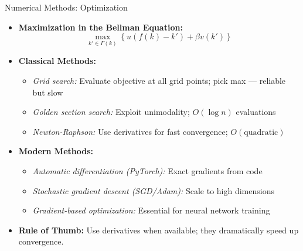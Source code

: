 \documentclass[10pt,english,aspectratio=169]{beamer}
\begin{document}
\begin{frame}{Numerical Methods: Optimization}
\begin{itemize}
\item \textbf{Maximization in the Bellman Equation:}
\[
\max_{k' \in \Gamma(k)} \left\{ u(f(k) - k') + \beta v(k') \right\}
\]

\medskip
\item \textbf{Classical Methods:}
\begin{itemize}
    \item \emph{Grid search:} Evaluate objective at all grid points; pick max --- reliable but slow
    \item \emph{Golden section search:} Exploit unimodality; $O(\log n)$ evaluations
    \item \emph{Newton-Raphson:} Use derivatives for fast convergence; $O(\text{quadratic})$
\end{itemize}

\medskip
\item \textbf{Modern Methods:}
\begin{itemize}
    \item \emph{Automatic differentiation (PyTorch):} Exact gradients from code
    \item \emph{Stochastic gradient descent (SGD/Adam):} Scale to high dimensions
    \item \emph{Gradient-based optimization:} Essential for neural network training
\end{itemize}

\medskip
\item \textbf{Rule of Thumb:} Use derivatives when available; they dramatically speed up convergence.
\end{itemize}
\end{frame}
\end{document}
